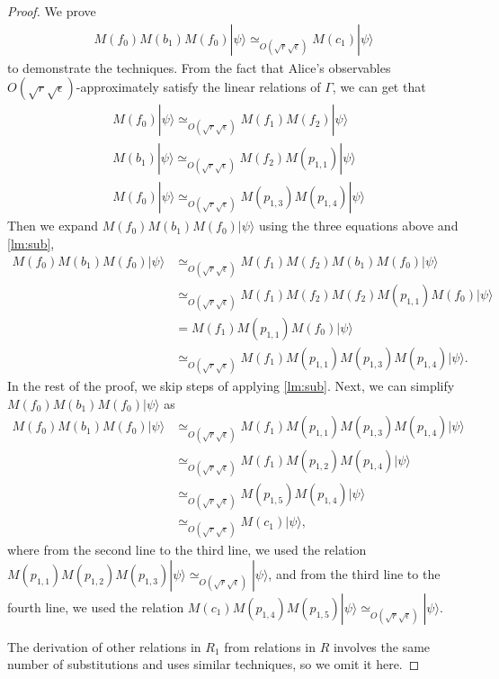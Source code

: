 \documentclass[11pt,letterpaper]{article}
\newcommand{\ket}[1]{|#1\rangle}
\newcommand{\1}{\mathbb{1}}
\newcommand{\se}{\sqrt{\epsilon}}
\newcommand{\sr}{\sqrt{r}}
\newcommand{\appd}[1]{\simeq_{#1}}
\theoremstyle{definition}
\begin{document}
\begin{proof}
    We prove 
    \begin{align}
        \label{eq:f0b1}
        M(f_0)M(b_1)M(f_0) \ket{\psi} \appd{O(\sr\se)} M(c_1)\ket{\psi}
    \end{align}
    to demonstrate the techniques.
    From the fact that Alice's observables $O(\sr\se)$-approximately
    satisfy the linear relations of $\Gamma$, we can get that
    \begin{align*}
        &M(f_0) \ket{\psi} \appd{O(\sr \se)} M(f_1)M(f_2)\ket{\psi} \\
        &M(b_1) \ket{\psi} \appd{O(\sr \se)} M(f_2)M(p_{1,1}) \ket{\psi}\\
        &M(f_0) \ket{\psi} \appd{O(\sr \se)} M(p_{1,3})M(p_{1,4}) \ket{\psi}
    \end{align*}
    Then we expand $M(f_0)M(b_1)M(f_0)\ket{\psi}$
    using the three equations above and \cref{lm:sub},
    \begin{align*}
        M(f_0)M(b_1)M(f_0) \ket{\psi} 
        &\appd{O(\sr \se)}M(f_1)M(f_2)M(b_1)M(f_0) \ket{\psi} \\
        &\appd{O(\sr \se)} M(f_1)M(f_2)M(f_2)M(p_{1,1})M(f_0) \ket{\psi} \\
        & = M(f_1)M(p_{1,1})M(f_0) \ket{\psi} \\
        & \appd{O(\sr \se)} M(f_1)M(p_{1,1})M(p_{1,3})M(p_{1,4}) \ket{\psi}.
    \end{align*}
    In the rest of the proof, we skip steps of applying \cref{lm:sub}.
    Next, we can simplify $M(f_0)M(b_1)M(f_0) \ket{\psi}$ as
    \begin{align*}
        M(f_0)M(b_1)M(f_0) \ket{\psi}
        &\appd{O(\sr \se)} M(f_1)M(p_{1,1})M(p_{1,3})M(p_{1,4}) \ket{\psi}\\
        &\appd{O(\sr \se)} M(f_1)M(p_{1,2})M(p_{1,4})\ket{\psi} \\
        &\appd{O(\sr \se)} M(p_{1,5})M(p_{1,4})\ket{\psi} \\
        & \appd{O(\sr \se)} M(c_1) \ket{\psi},
    \end{align*}
    where from the second line to the third line, we used
    the relation $M(p_{1,1})M(p_{1,2})M(p_{1,3})\ket{\psi} \appd{O(\sr \se)} \ket{\psi}$, and from the third line to the
    fourth line, we used the relation 
    $M(c_1)M(p_{1,4})M(p_{1,5})\ket{\psi} \appd{O(\sr \se)} \ket{\psi}$.
    
    The derivation of other relations in $R_1$ from relations in $R$
    involves the same number of substitutions and uses similar techniques, so we omit it here.
\end{proof}
\end{document}
